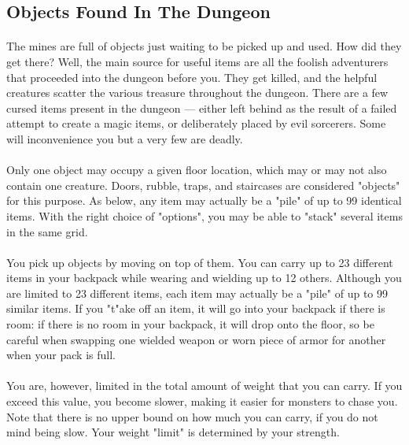 \subsection{Objects Found In The Dungeon}
\paragraph{}The mines are full of objects just waiting to be picked up and used. How
did they get there? Well, the main source for useful items are all the
foolish adventurers that proceeded into the dungeon before you. They get
killed, and the helpful creatures scatter the various treasure throughout
the dungeon. There are a few cursed items present in the dungeon ---
either left behind as the result of a failed attempt to create a magic items,
or deliberately placed by evil sorcerers. Some will inconvenience you but
a very few are deadly.

\paragraph{}Only one object may occupy a given floor location, which may or may not also
contain one creature. Doors, rubble, traps, and staircases are considered
"objects" for this purpose. As below, any item may actually be a "pile" of
up to 99 identical items. With the right choice of "options", you may be
able to "stack" several items in the same grid.

\paragraph{}You pick up objects by moving on top of them. You can carry up to 23
different items in your backpack while wearing and wielding up to 12 others.
Although you are limited to 23 different items, each item may actually be a
"pile" of up to 99 similar items. If you "t"ake off an item, it will go
into your backpack if there is room: if there is no room in your backpack,
it will drop onto the floor, so be careful when swapping one wielded weapon
or worn piece of armor for another when your pack is full.

\paragraph{}You are, however, limited in the total amount of weight that you can carry.
If you exceed this value, you become slower, making it easier for monsters
to chase you. Note that there is no upper bound on how much you can carry,
if you do not mind being slow. Your weight "limit" is determined by your
strength.

